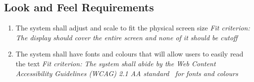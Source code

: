 \documentclass[12pt]{article}
\begin{document}
\subsection{Look and Feel Requirements}
\begin{enumerate}[LF\arabic*.]
	\item The system shall adjust and scale to fit the physical screen size\newline
    \textit{Fit criterion: The display should cover the entire screen and none of it should be cutoff}
	\item The system shall have fonts and colours that will allow users to easily read the text\newline
    \textit{Fit criterion: The system shall abide by the Web Content Accessibility Guidelines (WCAG) 2.1 AA standard~\citep{WCAG2.1}  for fonts and colours}
\end{enumerate}
\end{document}
